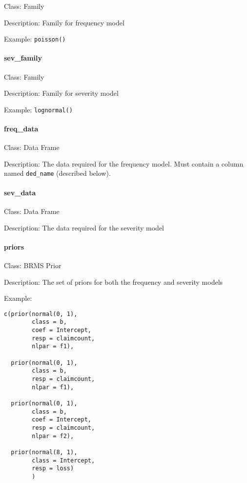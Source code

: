 \documentclass[
]{book}
\begin{document}
Class: Family

Description: Family for frequency model

Example: \texttt{poisson()}

\hypertarget{sev_family}{%
\paragraph{sev\_family}\label{sev_family}}

Class: Family

Description: Family for severity model

Example: \texttt{lognormal()}

\hypertarget{freq_data}{%
\paragraph{freq\_data}\label{freq_data}}

Class: Data Frame

Description: The data required for the frequency model. Must contain a column named \texttt{ded\_name} (described below).

\hypertarget{sev_data}{%
\paragraph{sev\_data}\label{sev_data}}

Class: Data Frame

Description: The data required for the severity model

\hypertarget{priors}{%
\paragraph{priors}\label{priors}}

Class: BRMS Prior

Description: The set of priors for both the frequency and severity models

Example:

\begin{verbatim}
c(prior(normal(0, 1),
        class = b,
        coef = Intercept,
        resp = claimcount,
        nlpar = f1),
        
  prior(normal(0, 1),
        class = b,
        resp = claimcount,
        nlpar = f1),
        
  prior(normal(0, 1),
        class = b,
        coef = Intercept,
        resp = claimcount,
        nlpar = f2),
               
  prior(normal(8, 1),
        class = Intercept,
        resp = loss)
        )
\end{verbatim}
\end{document}

